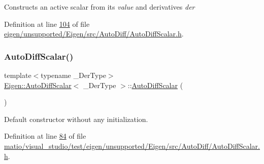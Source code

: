 Constructs an active scalar from its {\itshape value} and derivatives {\itshape der} 

Definition at line \hyperlink{eigen_2unsupported_2_eigen_2src_2_auto_diff_2_auto_diff_scalar_8h_source_l00104}{104} of file \hyperlink{eigen_2unsupported_2_eigen_2src_2_auto_diff_2_auto_diff_scalar_8h_source}{eigen/unsupported/\+Eigen/src/\+Auto\+Diff/\+Auto\+Diff\+Scalar.\+h}.

\mbox{\label{class_eigen_1_1_auto_diff_scalar_ae73d362745e986c00cee5658bf731412}} 
\subsubsection{\texorpdfstring{Auto\+Diff\+Scalar()}{AutoDiffScalar()}\hspace{0.1cm}{\footnotesize\ttfamily [5/8]}}
{\footnotesize\ttfamily template$<$typename \+\_\+\+Der\+Type$>$ \\
\hyperlink{class_eigen_1_1_auto_diff_scalar}{Eigen\+::\+Auto\+Diff\+Scalar}$<$ \+\_\+\+Der\+Type $>$\+::\hyperlink{class_eigen_1_1_auto_diff_scalar}{Auto\+Diff\+Scalar} (\begin{DoxyParamCaption}{ }\end{DoxyParamCaption})\hspace{0.3cm}{\ttfamily [inline]}}

Default constructor without any initialization. 

Definition at line \hyperlink{matio_2visual__studio_2test_2eigen_2unsupported_2_eigen_2src_2_auto_diff_2_auto_diff_scalar_8h_source_l00084}{84} of file \hyperlink{matio_2visual__studio_2test_2eigen_2unsupported_2_eigen_2src_2_auto_diff_2_auto_diff_scalar_8h_source}{matio/visual\+\_\+studio/test/eigen/unsupported/\+Eigen/src/\+Auto\+Diff/\+Auto\+Diff\+Scalar.\+h}.

\mbox{\label{class_eigen_1_1_auto_diff_scalar_a7f4f44f682ba5d500c34c4f2fa6ecb9e}} 
